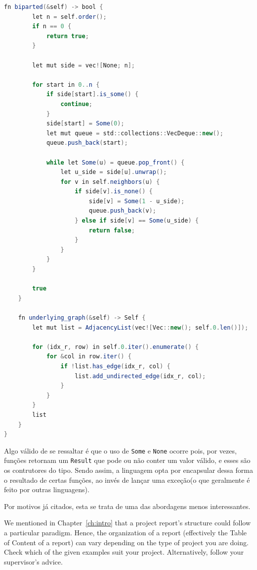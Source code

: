 \begin{lstlisting}[language=Java, caption={Implementação de Graph na Estrutura de Dados Matriz de Adjacência}, label=list:impl_adj_mat_g]
    fn biparted(&self) -> bool {
        let n = self.order();
        if n == 0 {
            return true;
        }

        let mut side = vec![None; n];

        for start in 0..n {
            if side[start].is_some() {
                continue;
            }
            side[start] = Some(0);
            let mut queue = std::collections::VecDeque::new();
            queue.push_back(start);

            while let Some(u) = queue.pop_front() {
                let u_side = side[u].unwrap();
                for v in self.neighbors(u) {
                    if side[v].is_none() {
                        side[v] = Some(1 - u_side);
                        queue.push_back(v);
                    } else if side[v] == Some(u_side) {
                        return false;
                    }
                }
            }
        }

        true
    }

    fn underlying_graph(&self) -> Self {
        let mut list = AdjacencyList(vec![Vec::new(); self.0.len()]);

        for (idx_r, row) in self.0.iter().enumerate() {
            for &col in row.iter() {
                if !list.has_edge(idx_r, col) {
                    list.add_undirected_edge(idx_r, col);
                }
            }
        }
        list
    }
}
\end{lstlisting}

Algo válido de se ressaltar é que o uso de \texttt{Some} e \texttt{None} ocorre pois, por vezes, funções retornam um \texttt{Result} que pode ou não conter um valor válido, e esses são os contrutores do tipo. Sendo assim, a linguagem opta por encapsular dessa forma o resultado de certas funções, ao invés de lançar uma exceção(o que geralmente é feito por outras linguagens).


Por motivos já citados, esta se trata de uma das abordagens menos interessantes.

We mentioned in Chapter~\ref{ch:intro} %
that a project report's structure could follow a particular paradigm.
Hence, the organization of a report (effectively the Table of Content
of a report) can vary depending on the type of project you are doing.
Check which of the given examples suit your project. Alternatively,
follow your supervisor's advice.

